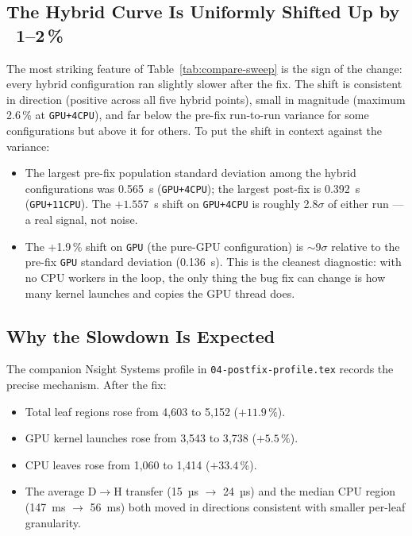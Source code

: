 \documentclass[
	english,
	letterpaper, oneside
]{article}
\begin{document}
\subsection{The Hybrid Curve Is Uniformly Shifted Up by ~1--2\,\%}

The most striking feature of Table~\ref{tab:compare-sweep} is the
sign of the change: every hybrid configuration ran slightly
slower after the fix. The shift is consistent in direction
(positive across all five hybrid points), small in magnitude
(maximum 2.6\,\% at \texttt{GPU+4CPU}), and far below the pre-fix
run-to-run variance for some configurations but above it for others. To
put the shift in context against the variance:

\begin{itemize}
    \item The largest pre-fix population standard deviation among the
    hybrid configurations was 0.565~s (\texttt{GPU+4CPU}); the largest
    post-fix is 0.392~s (\texttt{GPU+11CPU}). The $+1.557$~s shift on
    \texttt{GPU+4CPU} is roughly 2.8$\sigma$ of either run --- a real
    signal, not noise.
    \item The +1.9\,\% shift on \texttt{GPU} (the pure-GPU
    configuration) is $\sim$9$\sigma$ relative to the pre-fix
    \texttt{GPU} standard deviation (0.136~s). This is the cleanest
    diagnostic: with no CPU workers in the loop, the only thing the bug
    fix can change is how many kernel launches and copies the GPU
    thread does.
\end{itemize}

\subsection{Why the Slowdown Is Expected}

The companion Nsight Systems profile in \texttt{04-postfix-profile.tex}
records the precise mechanism. After the fix:

\begin{itemize}
    \item Total leaf regions rose from 4{,}603 to 5{,}152 ($+11.9\,\%$).
    \item GPU kernel launches rose from 3{,}543 to 3{,}738 ($+5.5\,\%$).
    \item CPU leaves rose from 1{,}060 to 1{,}414 ($+33.4\,\%$).
    \item The average D$\rightarrow$H transfer (15~µs $\to$ 24~µs) and
    the median CPU region (147~ms $\to$ 56~ms) both moved in directions
    consistent with smaller per-leaf granularity.
\end{itemize}
\end{document}
